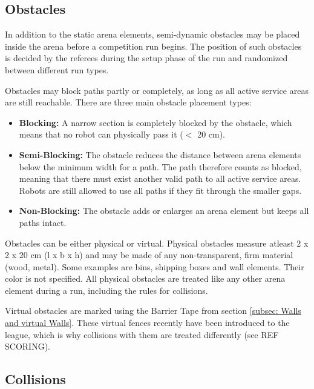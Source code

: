 \subsection{Obstacles}
\label{subsec: Obstacles}

In addition to the static arena elements, semi-dynamic obstacles may be placed inside the arena before a competition run begins. 
The position of such obstacles is decided by the referees during the setup phase of the run and randomized between different run types.

Obstacles may block paths partly or completely, as long as all active service areas are still reachable.
There are three main obstacle placement types:

\begin{itemize}
\item \textbf{Blocking:} 
A narrow section is completely blocked by the obstacle, which means that no robot can physically pass it ($<$ 20 cm).

\item \textbf{Semi-Blocking:} 
The obstacle reduces the distance between arena elements below the minimum width for a path. The path therefore counts as blocked, meaning that there must exist another valid path to all active service areas. Robots are still allowed to use all paths if they fit through the smaller gaps.

\item \textbf{Non-Blocking:}
The obstacle adds or enlarges an arena element but keeps all paths intact.
\end{itemize}

Obstacles can be either physical or virtual.
Physical obstacles measure atleast 2 x 2 x 20 cm (l x b x h) and may be made of any non-transparent, firm material (wood, metal). Some examples are bins, shipping boxes and wall elements. Their color is not specified.
All physical obstacles are treated like any other arena element during a run, including the rules for collisions.

Virtual obstacles are marked using the Barrier Tape from section \ref{subsec: Walls and virtual Walls}. 
These virtual fences recently have been introduced to the league, which is why collisions with them are treated differently (see REF SCORING).

\subsection{Collisions}
\label{subsec: Collisions}


